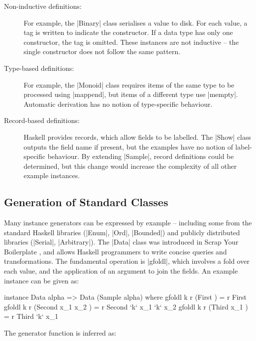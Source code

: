 \documentclass[preprint]{sigplanconf}
\begin{document}
\begin{description}

\item[Non-inductive definitions:] For example, the |Binary| class serialises a value to disk. For each value, a tag is written to indicate the constructor. If a data type has only one constructor, the tag is omitted. These instances are not inductive -- the single constructor does not follow the same pattern.

\item[Type-based definitions:] For example, the |Monoid| class requires items of the same type to be processed using |mappend|, but items of a different type use |mempty|. Automatic derivation has no notion of type-specific behaviour.

\item [Record-based definitions:] Haskell provides records, which allow fields to be labelled. The |Show| class outputs the field name if present, but the examples have no notion of label-specific behaviour. By extending |Sample|, record definitions could be determined, but this change would increase the complexity of all other example instances.

\end{description}

\subsection{Generation of Standard Classes}
\label{sec:automatic_success}

Many instance generators can be expressed by example -- including some from the standard Haskell libraries (|Enum|, |Ord|, |Bounded|) and publicly distributed libraries (|Serial|, |Arbitrary|). The |Data| class was introduced in Scrap Your Boilerplate \cite{lammel:syb}, and allows Haskell programmers to write concise queries and transformations. The fundamental operation is |gfoldl|, which involves a fold over each value, and the application of an argument to join the fields. An example instance can be given as:

\begin{code}
instance Data alpha => Data (Sample alpha) where
    gfoldl k r (First            ) = r First
    gfoldl k r (Second  x_1 x_2  ) = r Second  `k` x_1 `k` x_2
    gfoldl k r (Third   x_1      ) = r Third   `k` x_1
\end{code}

\noindent The generator function is inferred as:
\end{document}
